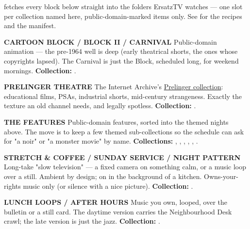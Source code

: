 \documentclass[fontpath=fonts/,logopath=logo/]{riposte-doc}
\begin{document}

\begin{ripnote}
\ripmarker{}   fetches every block below straight into the folders ErsatzTV watches — one slot per collection named here, public-domain-marked items only. See  for the recipes and the manifest.
\end{ripnote}

\begin{ripbullets}
\item \textbf{CARTOON BLOCK / BLOCK II / CARNIVAL}  Public-domain animation — the pre-1964 well is deep (early theatrical shorts, the ones whose copyrights lapsed). The Carnival is just the Block, scheduled long, for weekend mornings. \textbf{Collection:} .
\item \textbf{PRELINGER THEATRE}  The Internet Archive's \href{https://archive.org/details/prelinger}{Prelinger collection}: educational films, PSAs, industrial shorts, mid-century strangeness. Exactly the texture an old channel needs, and legally spotless. \textbf{Collection:} .
\item \textbf{THE FEATURES}  Public-domain features, sorted into the themed nights above. The move is to keep a few themed sub-collections so the schedule can ask for "a noir" or "a monster movie" by name. \textbf{Collections:} , , , , , .
\item \textbf{STRETCH \& COFFEE / SUNDAY SERVICE / NIGHT PATTERN}  Long-take "slow television" — a fixed camera on something calm, or a music loop over a still. Ambient by design; on in the background of a kitchen. Owns-your- rights music only (or silence with a nice picture). \textbf{Collection:} .
\item \textbf{LUNCH LOOPS / AFTER HOURS}  Music you own, looped, over the bulletin or a still card. The daytime version carries the Neighbourhood Desk crawl; the late version is just the jazz. \textbf{Collection:} .
\end{ripbullets}
\end{document}
